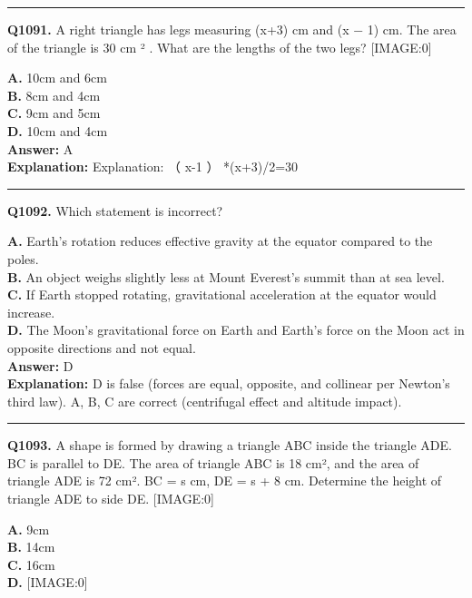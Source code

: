 \documentclass[12pt]{article}
\begin{document}
\hrule
\vspace{1em}


\noindent
\textbf{Q1091.} A right triangle has legs measuring (x+3) cm and (x
−
1) cm. The area of the triangle is 30
cm
²
. What are the lengths of the two legs?
[IMAGE:0]



\textbf{A.} 10cm and 6cm \\
\textbf{B.} 8cm and 4cm \\
\textbf{C.} 9cm and 5cm \\
\textbf{D.} 10cm and 4cm \\

\textbf{Answer:} A \\
\textbf{Explanation:} Explanation:
（
x-1
）
*(x+3)/2=30

\hrule
\vspace{1em}


\noindent
\textbf{Q1092.} Which statement is incorrect?



\textbf{A.} Earth’s rotation reduces effective gravity at the equator compared to the poles. \\
\textbf{B.} An object weighs slightly less at Mount Everest’s summit than at sea level. \\
\textbf{C.} If Earth stopped rotating, gravitational acceleration at the equator would increase. \\
\textbf{D.} The Moon’s gravitational force on Earth and Earth’s force on the Moon act in opposite directions and not equal. \\

\textbf{Answer:} D \\
\textbf{Explanation:} D is false (forces are equal, opposite, and collinear per Newton’s third law). A, B, C are correct (centrifugal effect and altitude impact).

\hrule
\vspace{1em}


\noindent
\textbf{Q1093.} A shape is formed by drawing a triangle ABC inside the triangle ADE. BC is parallel to DE. The area of triangle ABC is 18 cm², and the area of triangle ADE is 72 cm². BC = s cm, DE = s + 8 cm.
Determine the height of triangle ADE to side DE.
[IMAGE:0]



\textbf{A.} 9cm \\
\textbf{B.} 14cm \\
\textbf{C.} 16cm \\
\textbf{D.} [IMAGE:0] \\
\end{document}
